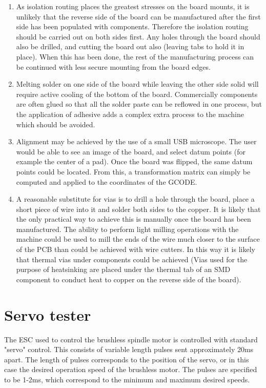 \documentclass[a4paper,11pt]{article}  %
\begin{document}
\begin{enumerate}
	\item	As isolation routing places the greatest stresses on the board mounts, it is unlikely that the reverse side of the board can be manufactured
			after the first side has been populated with components. Therefore the isolation routing should be carried out on both sides first. Any holes
			through the board should also be drilled, and cutting the board out also (leaving tabs to hold it in place). When this has been done, the
			rest of the manufacturing process can be continued with less secure mounting from the board edges.
	\item	Melting solder on one side of the board while leaving the other side solid will require active cooling of the bottom of the board. Commercially
			components are often glued so that all the solder paste can be reflowed in one process, but the application of adhesive adds a complex extra
			process to the machine which should be avoided.
	\item	Alignment may be achieved by the use of a small USB microscope. The user would be able to see an image of the board, and select datum points (for
			example the center of a pad). Once the board was flipped, the same datum points could be located. From this, a transformation matrix can simply
			be computed and applied to the coordinates of the GCODE.
	\item	A reasonable substitute for vias is to drill a hole through the board, place a short piece of wire into it and solder both sides to the copper.
			It is likely that the only practical way to achieve this is manually once the board has been manufactured. The ability to perform light milling
			operations with the machine could be used to mill the ends of the wire much closer to the surface of the PCB than could be achieved with wire cutters.
			In this way it is likely that thermal vias under components could be achieved (Vias used for the purpose of heatsinking are placed under the thermal
			tab of an SMD component to conduct heat to copper on the reverse side of the board).
\end{enumerate}

\newpage
\appendix
\appendixpage
\addappheadtotoc
\section{Servo tester}

The ESC used to control the brushless spindle motor is controlled with standard "servo" control. This consists of variable length pulses sent approximately 20ms apart.
The length of pulses corresponds to the position of the servo, or in this case the desired operation speed of the brushless motor. The pulses are specified to be 1-2ms,
which correspond to the minimum and maximum desired speeds.
\end{document}
